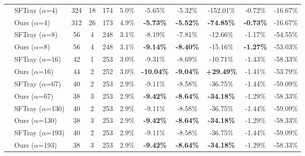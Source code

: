 \begin{table}[t]
{\begin{tabular}{ll|cccc|ccc|cc}
\addlinespace[0.3em]

 & SFTray ($\alpha$=4) & 324 & 18 & 174 & 5.0\% & -5.65\% & -5.32\% & -152.01\% & -0.72\% & -16.67\% \\

 & Ours ($\alpha$=4) & 312 & 26 & 173 & 4.9\% & \textbf{-5.73\%} & \textbf{-5.52\%} & \textbf{-74.85\%} & \textbf{-0.73\%} & -16.67\% \\

\addlinespace[0.3em]

 & SFTray ($\alpha$=8) & 56 & 4 & 248 & 3.1\% & -8.19\% & -7.81\% & -12.66\% & -1.17\% & -54.55\% \\

 & Ours ($\alpha$=8) & 56 & 4 & 248 & 3.1\% & \textbf{-9.14\%} & \textbf{-8.40\%} & -15.16\% & \textbf{-1.27\%} & -53.03\% \\

\addlinespace[0.3em]

 & SFTray ($\alpha$=16) & 42 & 1 & 253 & 3.0\% & -9.31\% & -8.69\% & -10.71\% & -1.43\% & -58.33\% \\

 & Ours ($\alpha$=16) & 44 & 2 & 252 & 3.0\% & \textbf{-10.04\%} & \textbf{-9.04\%} & \textbf{+29.49\%} & -1.41\% & -53.79\% \\

\addlinespace[0.3em]

 & SFTray ($\alpha$=67) & 40 & 2 & 253 & 2.9\% & -9.11\% & -8.58\% & -36.75\% & -1.44\% & -59.09\% \\

 & Ours ($\alpha$=67) & 38 & 3 & 253 & 2.9\% & \textbf{-9.42\%} & \textbf{-8.64\%} & \textbf{-34.18\%} & -1.29\% & -58.33\% \\

\addlinespace[0.3em]

 & SFTray ($\alpha$=130) & 40 & 2 & 253 & 2.9\% & -9.11\% & -8.58\% & -36.75\% & -1.44\% & -59.09\% \\

 & Ours ($\alpha$=130) & 38 & 3 & 253 & 2.9\% & \textbf{-9.42\%} & \textbf{-8.64\%} & \textbf{-34.18\%} & -1.29\% & -58.33\% \\

\addlinespace[0.3em]

 & SFTray ($\alpha$=193) & 40 & 2 & 253 & 2.9\% & -9.11\% & -8.58\% & -36.75\% & -1.44\% & -59.09\% \\

 & Ours ($\alpha$=193) & 38 & 3 & 253 & 2.9\% & \textbf{-9.42\%} & \textbf{-8.64\%} & \textbf{-34.18\%} & -1.29\% & -58.33\% \\


\end{tabular}}
\end{table}
